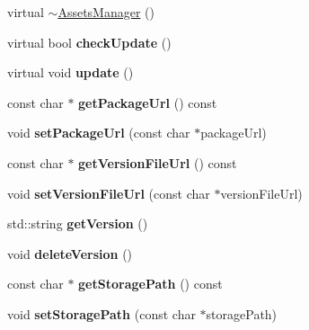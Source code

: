 \begin{DoxyCompactItemize}
\item 
virtual \hyperlink{classAssetsManager_a059cca91ff2ea8871011da0225c614bb}{$\sim$\+Assets\+Manager} ()
\item 
\mbox{\label{classAssetsManager_aff6c4cee82ffb699c565b4c7b1c9c280}} 
virtual bool {\bfseries check\+Update} ()
\item 
\mbox{\label{classAssetsManager_a9370c48b5c196944dd19c27dd8058af4}} 
virtual void {\bfseries update} ()
\item 
\mbox{\label{classAssetsManager_adfcf62d7d0d7d37d07d2a9869e186b51}} 
const char $\ast$ {\bfseries get\+Package\+Url} () const
\item 
\mbox{\label{classAssetsManager_aa5234577a726a8ebf5bd56b4369ba647}} 
void {\bfseries set\+Package\+Url} (const char $\ast$package\+Url)
\item 
\mbox{\label{classAssetsManager_ace4e93d2a454abd3a4bf1fe35b78086f}} 
const char $\ast$ {\bfseries get\+Version\+File\+Url} () const
\item 
\mbox{\label{classAssetsManager_a3048ff13ed5b96c9f15773e765d2037d}} 
void {\bfseries set\+Version\+File\+Url} (const char $\ast$version\+File\+Url)
\item 
\mbox{\label{classAssetsManager_ad97e9ecf9072c7a6db0e1f02e326fb11}} 
std\+::string {\bfseries get\+Version} ()
\item 
\mbox{\label{classAssetsManager_a73f93d30f3dd699558e25b07d42cf648}} 
void {\bfseries delete\+Version} ()
\item 
\mbox{\label{classAssetsManager_a892e3c0f359039ea119f21ddc5a1a2e1}} 
const char $\ast$ {\bfseries get\+Storage\+Path} () const
\item 
\mbox{\label{classAssetsManager_ab4f07674f77335d2011b6d20cf2f10cf}} 
void {\bfseries set\+Storage\+Path} (const char $\ast$storage\+Path)
\item 
\mbox{\label{classAssetsManager_a3a146a72ce6e481f8833cce8e007b881}} 

\end{DoxyCompactItemize}
